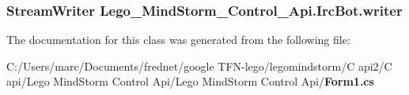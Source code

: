 \subsubsection[{writer}]{\setlength{\rightskip}{0pt plus 5cm}StreamWriter {\bf Lego\_\-MindStorm\_\-Control\_\-Api.IrcBot.writer}\hspace{0.3cm}{\tt  [static]}}\label{class_lego___mind_storm___control___api_1_1_irc_bot_a2ff9fcaa402bb836bd7b73a083035e9}




The documentation for this class was generated from the following file:\begin{CompactItemize}
\item 
C:/Users/marc/Documents/frednet/google TFN-lego/legomindstorm/C api2/C api/Lego MindStorm Control Api/Lego MindStorm Control Api/{\bf Form1.cs}\end{CompactItemize}

